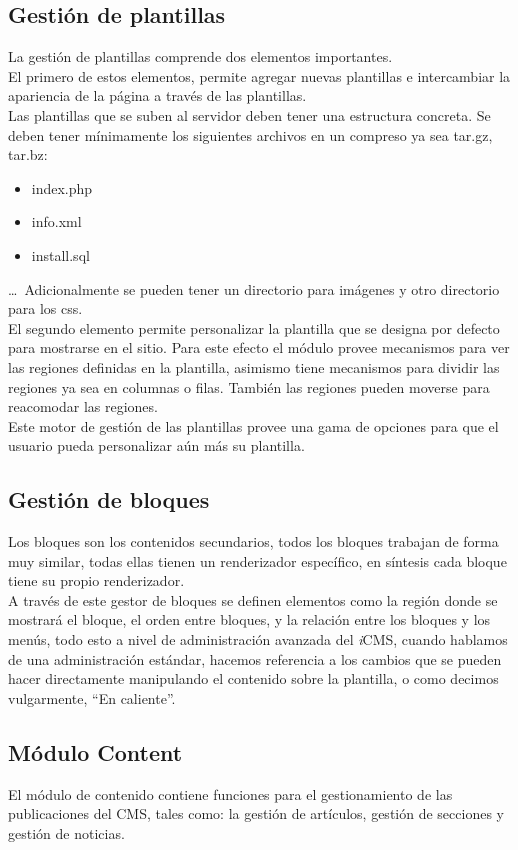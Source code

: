 \subsection{Gesti\'on de plantillas}
La gesti\'on de plantillas comprende dos elementos importantes.\\
El primero de estos elementos, permite agregar nuevas plantillas e intercambiar la apariencia de la p\'agina a trav\'es de las plantillas.\\
Las plantillas que se suben al servidor deben tener una estructura concreta. Se deben tener m\'inimamente los siguientes archivos en un compreso ya sea tar.gz, tar.bz:
\begin{itemize}
\item index.php
\item info.xml
\item install.sql
\end{itemize}
\ldots\ Adicionalmente se pueden tener un directorio para im\'agenes y otro directorio para los css.\\
El segundo elemento permite personalizar la plantilla que se designa por defecto para mostrarse en el sitio. Para este efecto el m\'odulo provee mecanismos para ver las regiones definidas en la plantilla, asimismo tiene mecanismos para dividir las regiones ya sea en columnas o filas. Tambi\'en las regiones pueden moverse para reacomodar las regiones.\\
Este motor de gesti\'on de las plantillas provee una gama de opciones para que el usuario pueda personalizar a\'un m\'as su plantilla.

\subsection{Gesti\'on de bloques}
Los bloques son los contenidos secundarios, todos los bloques trabajan de forma muy similar, todas ellas tienen un renderizador espec\'ifico, en s\'intesis cada bloque tiene su propio renderizador.\\
A trav\'es de este gestor de bloques se definen elementos como la regi\'on donde se mostrar\'a el bloque, el orden entre bloques, y la relaci\'on entre los bloques y los men\'us, todo esto a nivel de administraci\'on avanzada del \textit{i}CMS, cuando hablamos de una administraci\'on est\'andar, hacemos referencia a los cambios que se pueden hacer directamente manipulando el contenido sobre la plantilla, o como decimos vulgarmente, ``En caliente''.

\subsection{M\'odulo Content}
El m\'odulo de contenido contiene funciones para el gestionamiento de las publicaciones del CMS, tales como: la gesti\'on de art\'iculos, gesti\'on de secciones y gesti\'on de noticias.

